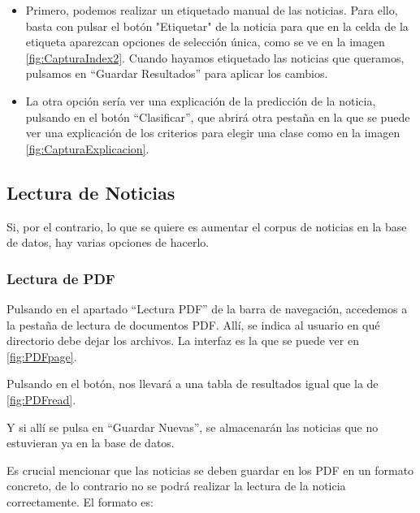 \begin{itemize}

\item Primero, podemos realizar un etiquetado manual de las noticias. Para ello, basta con pulsar el botón "Etiquetar" de la noticia para que en la celda de la etiqueta aparezcan opciones de selección única, como se ve en la imagen \ref{fig:CapturaIndex2}. Cuando hayamos etiquetado las noticias que queramos, pulsamos en ``Guardar Resultados'' para aplicar los cambios.

\item La otra opción sería ver una explicación de la predicción de la noticia, pulsando en el botón ``Clasificar'', que abrirá otra pestaña en la que se puede ver una explicación de los criterios para elegir una clase como en la imagen \ref{fig:CapturaExplicacion}.

\end{itemize}

\subsection{Lectura de Noticias}

Si, por el contrario, lo que se quiere es aumentar el corpus de noticias en la base de datos, hay varias opciones de hacerlo.

\subsubsection{Lectura de PDF}

Pulsando en el apartado ``Lectura PDF'' de la barra de navegación, accedemos a la pestaña de lectura de documentos PDF. Allí, se indica al usuario en qué directorio debe dejar los archivos. La interfaz es la que se puede ver en \ref{fig:PDFpage}.


Pulsando en el botón, nos llevará a una tabla de resultados igual que la de \ref{fig:PDFread}.


Y si allí se pulsa en ``Guardar Nuevas'', se almacenarán las noticias que no estuvieran ya en la base de datos.

Es crucial mencionar que las noticias se deben guardar en los PDF en un formato concreto, de lo contrario no se podrá realizar la lectura de la noticia correctamente. El formato es:

